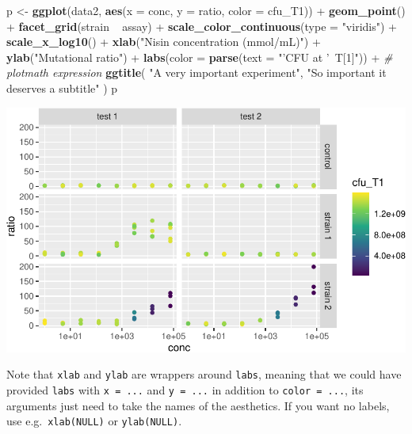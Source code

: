 \documentclass[]{book}
\newenvironment{Shaded}{}{}
\newcommand{\CommentTok}[1]{\textcolor[rgb]{0.38,0.63,0.69}{\textit{#1}}}
\newcommand{\DataTypeTok}[1]{\textcolor[rgb]{0.56,0.13,0.00}{#1}}
\newcommand{\KeywordTok}[1]{\textcolor[rgb]{0.00,0.44,0.13}{\textbf{#1}}}
\newcommand{\NormalTok}[1]{#1}
\newcommand{\OperatorTok}[1]{\textcolor[rgb]{0.40,0.40,0.40}{#1}}
\newcommand{\StringTok}[1]{\textcolor[rgb]{0.25,0.44,0.63}{#1}}
\begin{document}
\begin{Shaded}
\begin{Highlighting}[]
\NormalTok{p <-}\StringTok{ }\KeywordTok{ggplot}\NormalTok{(data2, }\KeywordTok{aes}\NormalTok{(}\DataTypeTok{x =}\NormalTok{ conc, }\DataTypeTok{y =}\NormalTok{ ratio, }\DataTypeTok{color =}\NormalTok{ cfu_T1)) }\OperatorTok{+}
\StringTok{  }\KeywordTok{geom_point}\NormalTok{() }\OperatorTok{+}
\StringTok{  }\KeywordTok{facet_grid}\NormalTok{(strain }\OperatorTok{~}\StringTok{ }\NormalTok{assay) }\OperatorTok{+}
\StringTok{  }\KeywordTok{scale_color_continuous}\NormalTok{(}\DataTypeTok{type =} \StringTok{"viridis"}\NormalTok{) }\OperatorTok{+}
\StringTok{  }\KeywordTok{scale_x_log10}\NormalTok{() }\OperatorTok{+}
\StringTok{  }\KeywordTok{xlab}\NormalTok{(}\StringTok{"Nisin concentration (mmol/mL)"}\NormalTok{) }\OperatorTok{+}
\StringTok{  }\KeywordTok{ylab}\NormalTok{(}\StringTok{"Mutational ratio"}\NormalTok{) }\OperatorTok{+}
\StringTok{  }\KeywordTok{labs}\NormalTok{(}\DataTypeTok{color =} \KeywordTok{parse}\NormalTok{(}\DataTypeTok{text =} \StringTok{"'CFU at '~T[1]"}\NormalTok{)) }\OperatorTok{+}\StringTok{ }\CommentTok{# plotmath expression}
\StringTok{  }\KeywordTok{ggtitle}\NormalTok{(}
    \StringTok{"A very important experiment"}\NormalTok{, }
    \StringTok{"So important it deserves a subtitle"}
\NormalTok{  )}
\NormalTok{p}
\end{Highlighting}
\end{Shaded}

\begin{center}\includegraphics[width=\textwidth]{TRES-Tidy-Tutorial_files/figure-latex/unnamed-chunk-142-1} \end{center}

Note that \texttt{xlab} and \texttt{ylab} are wrappers around \texttt{labs}, meaning that we could have provided \texttt{labs} with \texttt{x\ =\ ...} and \texttt{y\ =\ ...} in addition to \texttt{color\ =\ ...}, its arguments just need to take the names of the aesthetics. If you want no labels, use e.g.~\texttt{xlab(NULL)} or \texttt{ylab(NULL)}.
\end{document}
